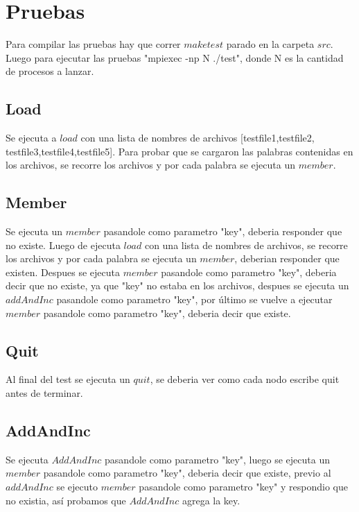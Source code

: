 \section{Pruebas}

Para compilar las pruebas hay que correr $make test$ parado en la carpeta $src$.
Luego para ejecutar las pruebas "mpiexec -np N ./test", donde N es la cantidad
de procesos a lanzar.

\subsection{Load}

Se ejecuta a $load$ con una lista de nombres de archivos [testfile1,testfile2,
testfile3,testfile4,testfile5]. Para probar que se cargaron las palabras
contenidas en los archivos, se recorre los archivos y por cada palabra se
ejecuta un $member$.

\subsection{Member}

Se ejecuta un $member$ pasandole como parametro "key", deberia responder que
no existe. Luego de ejecuta $load$ con una lista de nombres de archivos, se
recorre los archivos y por cada palabra se ejecuta un $member$, deberian
responder que existen. Despues se ejecuta $member$ pasandole como parametro
"key", deberia decir que no existe, ya que "key" no estaba en los archivos,
despues se ejecuta un $addAndInc$ pasandole como parametro "key", por último
se vuelve a ejecutar $member$ pasandole como parametro "key", deberia decir
que existe.

\subsection{Quit}

Al final del test se ejecuta un $quit$, se deberia ver como cada nodo escribe
quit antes de terminar.

\subsection{AddAndInc}

Se ejecuta $AddAndInc$ pasandole como parametro "key", luego se ejecuta un
$member$ pasandole como parametro "key", deberia decir que existe, previo al
$addAndInc$ se ejecuto $member$ pasandole como parametro "key" y respondio que
no existia, así probamos que $AddAndInc$ agrega la key.

